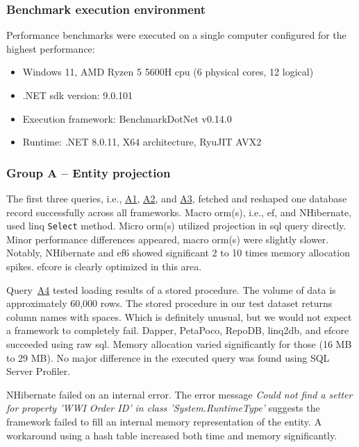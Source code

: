 \subsubsection{Benchmark execution environment}
Performance benchmarks were executed on a single computer configured for the highest performance:
\begin{itemize}
    \item Windows 11, AMD Ryzen 5 5600H \acrshort{cpu} (6 physical cores, 12 logical)
    \item .NET \acrshort{sdk} version: 9.0.101
    \item Execution framework: BenchmarkDotNet v0.14.0
    \item Runtime: .NET 8.0.11, X64 architecture, RyuJIT AVX2
\end{itemize}

\subsubsection{Group A -- Entity projection}
The first three queries, i.e., \hyperref[query:a1]{A1}, \hyperref[query:a2]{A2}, and \hyperref[query:a3]{A3}, fetched and reshaped one database record successfully across all frameworks. Macro \acrshort{orm}(s), i.e., \acrshort{ef}, and NHibernate, used \acrshort{linq} \texttt{Select} method. Micro \acrshort{orm}(s) utilized projection in \acrshort{sql} query directly.
Minor performance differences appeared, macro \acrshort{orm}(s) were slightly slower. Notably, NHibernate and \acrshort{ef}6 showed significant 2 to 10 times memory allocation spikes. \acrshort{efcore} is clearly optimized in this area.

Query~\hyperref[query:a4]{A4} tested loading results of a stored procedure. The volume of data is approximately 60,000 rows. The stored procedure in our test dataset returns column names with spaces. Which is definitely unusual, but we would not expect a framework to completely fail. Dapper, PetaPoco, RepoDB, linq2db, and \acrshort{efcore} succeeded using raw \acrshort{sql}. Memory allocation varied significantly for those (16 MB to 29 MB). No major difference in the executed query was found using SQL Server Profiler.

NHibernate failed on an internal error. The error message \textit{Could not find a setter for property 'WWI Order ID' in class 'System.RuntimeType'} suggests the framework failed to fill an internal memory representation of the entity. A workaround using a hash table increased both time and memory significantly.

